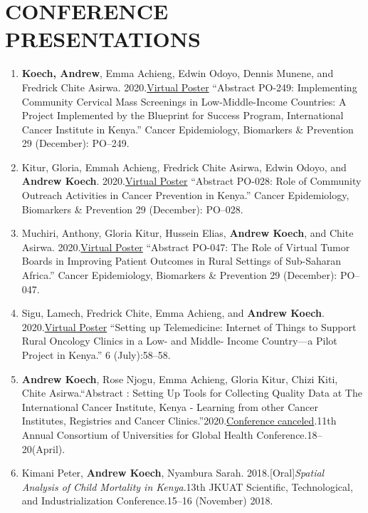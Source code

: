 \documentclass[13pt,]{article}
\begin{document}
\hypertarget{conference-presentations}{%
\section{\texorpdfstring{\textbf{CONFERENCE
PRESENTATIONS}}{CONFERENCE PRESENTATIONS}}\label{conference-presentations}}

\begin{enumerate}
\def\labelenumi{\arabic{enumi}.}
\item
  \textbf{Koech, Andrew}, Emma Achieng, Edwin Odoyo, Dennis Munene, and
  Fredrick Chite Asirwa.
  2020.\href{https://doi.org/10.1158/1538-7755.DISP20-PO-249}{Virtual
  Poster} ``Abstract PO-249: Implementing Community Cervical Mass
  Screenings in Low-Middle-Income Countries: A Project Implemented by
  the Blueprint for Success Program, International Cancer Institute in
  Kenya.'' Cancer Epidemiology, Biomarkers \& Prevention 29 (December):
  PO--249.
\item
  Kitur, Gloria, Emmah Achieng, Fredrick Chite Asirwa, Edwin Odoyo, and
  \textbf{Andrew Koech}.
  2020.\href{https://doi.org/10.1158/1538-7755.DISP20-PO-028}{Virtual
  Poster} ``Abstract PO-028: Role of Community Outreach Activities in
  Cancer Prevention in Kenya.'' Cancer Epidemiology, Biomarkers \&
  Prevention 29 (December): PO--028.
\item
  Muchiri, Anthony, Gloria Kitur, Hussein Elias, \textbf{Andrew Koech},
  and Chite Asirwa.
  2020.\href{https://doi.org/10.1158/1538-7755.DISP20-PO-047}{Virtual
  Poster} ``Abstract PO-047: The Role of Virtual Tumor Boards in
  Improving Patient Outcomes in Rural Settings of Sub-Saharan Africa.''
  Cancer Epidemiology, Biomarkers \& Prevention 29 (December): PO--047.
\item
  Sigu, Lamech, Fredrick Chite, Emma Achieng, and \textbf{Andrew Koech}.
  2020.\href{https://doi.org/10.1200/GO.20.54000}{Virtual Poster}
  ``Setting up Telemedicine: Internet of Things to Support Rural
  Oncology Clinics in a Low- and Middle- Income Country---a Pilot
  Project in Kenya.'' 6 (July):58--58.
\item
  \textbf{Andrew Koech}, Rose Njogu, Emma Achieng, Gloria Kitur, Chizi
  Kiti, Chite Asirwa.``Abstract : Setting Up Tools for Collecting
  Quality Data at The International Cancer Institute, Kenya - Learning
  from other Cancer Institutes, Registries and Cancer
  Clinics.''2020.\href{https://www.dropbox.com/s/lq0owvwya6dcjfh/1\%20CUGH\%202020\%20eBook_Abstracts_Global\%20Health\%20Education.pdf?dl=0}{Conference
  canceled}.11th Annual Consortium of Universities for Global Health
  Conference.18--20(April).
\item
  Kimani Peter, \textbf{Andrew Koech}, Nyambura Sarah.
  2018.{[}Oral{]}\emph{Spatial Analysis of Child Mortality in
  Kenya}.13th JKUAT Scientific, Technological, and Industrialization
  Conference.15--16 (November) 2018.
\end{enumerate}
\end{document}

